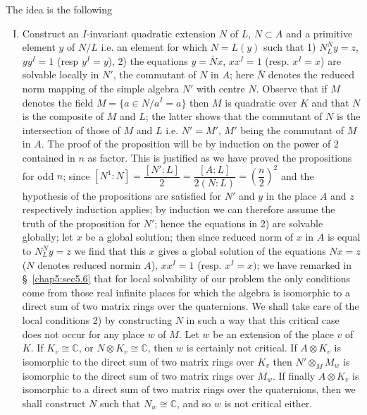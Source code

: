 The idea is the following 
\begin{enumerate}[I)]
\item Construct an $I$-invariant quadratic extension $N$ of $L$, $N
  \subset A$ and a primitive element $y$ of $N/L$ i.e. an element
  for which $N = L(y)$ such that 1) $N^{N}_{L}y = z$, $yy^I = 1$ (resp
  $y^I = y$), 2) the equations $y = \bar{N}x$,  $xx^I = 1$  (resp. $x^I =
  x$) are solvable locally in $N'$, the  commutant of $N$ in  $A$;
  here $\bar{N}$ denotes the reduced norm mapping of the simple
  algebra $N'$ with centre $N$. Observe that if $M$ denotes the field
  $M =  \{a \in N/a^I = a\}$ then  $M$ is quadratic over $K$ and that
  $N$ is the composite of $M$ and $L$; the  latter shows that the
  commutant  of $N$ is the intersection of those of $M$ and $L$
  i.e. $N' = M'$, $M'$ being the commutant of $M$ in $A$. The proof of
  the proposition will be by induction on the power of 2
  contained in  $n$ as factor. This is justified as we have proved the
  propositions for odd $n$; since  $[N^1 : N] =\dfrac{[N' : L]}{2} =
  \dfrac{[A : L]}{2(N:L)} = (\dfrac{n}{2})^2$ and the hypothesis of
  the  propositions  are satisfied for $N'$ and $y$ in the place $A$
  and $z$ respectively induction applies; by induction we can
  therefore assume the truth of the  proposition for $N'$; hence the
  equations in 2) are solvable  globally; let $x$ be a  global
  solution; then since reduced norm of $x$ in $A$ is equal to
  $N^{N}_{L}y = z$ we find that this $x$ gives a global solution of
  the  equations $Nx = z $ ($N$ denotes reduced norm\pageoriginale in
  $A$), $xx^I = 1$ (resp. $x^I =x)$; we have remarked in 
  \S~\ref{chap5:sec5.6} that   for local 
  solvability of our problem the only conditions come from those real
  infinite places for which the algebra is isomorphic to a direct sum
  of two matrix rings over the quaternions. We shall take care of the
  local conditions 2) by constructing $N$ in such a way that this
  critical case does not occur for any place $w$ of $M$. Let $w$ be an
  extension of the place $v$ of $K$. If $K_v \cong \mathbb{C}$, or $N
  \otimes K_v \cong \mathbb{C}$, then $w$ is certainly not
  critical. If $A \otimes K_v$ is isomorphic to 
  the direct sum of two matrix rings over $K_v$ then $N' \otimes_M
  M_w$ is isomorphic to the direct sum of two matrix rings over $M_w$. If
  finally $A \otimes K_v$ is isomorphic to a direct sum of two
  matrix rings over the quaternions, then we shall construct $N$ such
  that  $N_w \cong \mathbb{C}$, and so $w$ is not  critical either.  


\end{enumerate}
